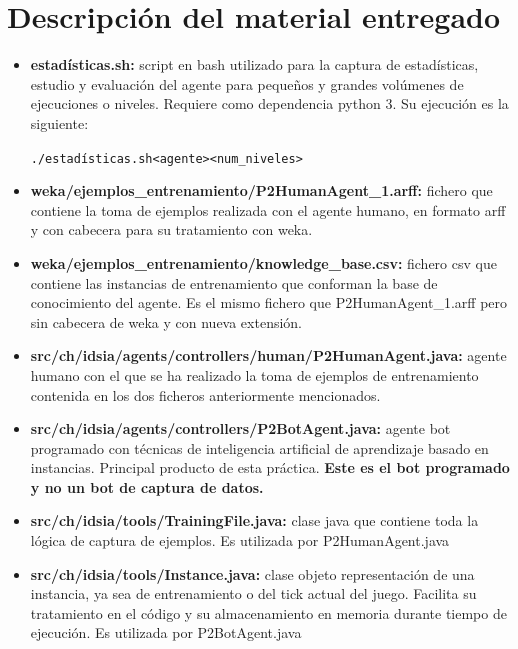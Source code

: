 \documentclass[10pt, spanish, pdftex]{../.template/template}
\begin{document}
    \section{Descripción del material entregado}
\begin{itemize}
    \item \textbf{estadísticas.sh:} script en bash utilizado para la captura de estadísticas, estudio y evaluación del agente para pequeños y grandes volúmenes de ejecuciones o niveles. Requiere como dependencia python 3. Su ejecución es la siguiente:
        \begin{center}
            \texttt{./estadísticas.sh\hspace{1em}<agente>\hspace{1em}<num\_niveles>}
        \end{center}
    \item \textbf{weka/ejemplos\_entrenamiento/P2HumanAgent\_1.arff:} fichero que contiene la toma de ejemplos realizada con el agente humano, en formato arff y con cabecera para su tratamiento con weka.
    \item \textbf{weka/ejemplos\_entrenamiento/knowledge\_base.csv:} fichero csv que contiene las instancias de entrenamiento que conforman la base de conocimiento del agente. Es el mismo fichero que P2HumanAgent\_1.arff pero sin cabecera de weka y con nueva extensión.
    \item \textbf{src/ch/idsia/agents/controllers/human/P2HumanAgent.java:} agente humano con el que se ha realizado la toma de ejemplos de entrenamiento contenida en los dos ficheros anteriormente mencionados.
    \item \textbf{src/ch/idsia/agents/controllers/P2BotAgent.java:} agente bot programado con técnicas de inteligencia artificial de aprendizaje basado en instancias. Principal producto de esta práctica. \textbf{Este es el bot programado y no un bot de captura de datos.}
    \item \textbf{src/ch/idsia/tools/TrainingFile.java:} clase java que contiene toda la lógica de captura de ejemplos. Es utilizada por P2HumanAgent.java
    \item \textbf{src/ch/idsia/tools/Instance.java:} clase objeto representación de una instancia, ya sea de entrenamiento o del tick actual del juego. Facilita su tratamiento en el código y su almacenamiento en memoria durante tiempo de ejecución. Es utilizada por P2BotAgent.java
\end{itemize}
\end{document}
